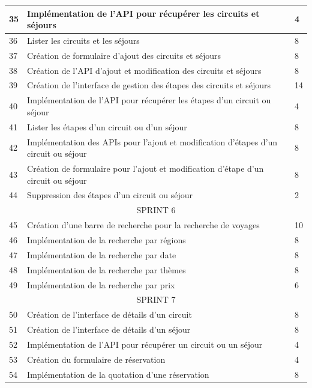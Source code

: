 \documentclass[12pt]{report}
\begin{document}
\begin{longtable}{|p{1cm}|p{7cm}|p{6cm}|}
						\hline
						35 & Implémentation de l'API pour récupérer les circuits et séjours & 4\\
						\hline
						36 & Lister les circuits et les séjours & 8\\
						\hline
						37 & Création de formulaire d'ajout des circuits et séjours & 8\\
						\hline
						38 & Création de l'API d'ajout et modification des circuits et séjours & 8\\
						\hline
						39 & Création de l'interface de gestion des étapes des circuits et séjours & 14\\
						\hline
						40 & Implémentation de l'API pour récupérer les étapes d'un circuit ou séjour & 4\\
						\hline
						41 & Lister les étapes d'un circuit ou d'un séjour & 8\\
						\hline
						42 & Implémentation des APIs pour l'ajout et modification d'étapes d'un circuit ou séjour & 8\\
						\hline
						43 & Création de formulaire pour l'ajout et modification d'étape d'un circuit ou séjour & 8\\
						\hline
						44 & Suppression des étapes d'un circuit ou séjour & 2\\
						\hline
						\multicolumn{3}{|c|}{SPRINT 6}\\
						\hline
						45 & Création d'une barre de recherche pour la recherche de voyages & 10\\
						\hline
						46 & Implémentation de la recherche par régions & 8\\
						\hline
						47 & Implémentation de la recherche par date & 8\\
						\hline
						48 & Implémentation de la recherche par thèmes & 8\\
						\hline
						49 & Implémentation de la recherche par prix & 6\\
						\hline
						\multicolumn{3}{|c|}{SPRINT 7}\\
						\hline
						50 & Création de l'interface de détails d'un circuit & 8\\
						\hline
						51 & Création de l'interface de détails d'un séjour & 8\\
						\hline
						52 & Implémentation de l'API pour récupérer un circuit ou un séjour & 4\\
						\hline
						53 & Création du formulaire de réservation & 4\\
						\hline
						54 & Implémentation de la quotation d'une réservation & 8\\

\end{longtable}
\end{document}
